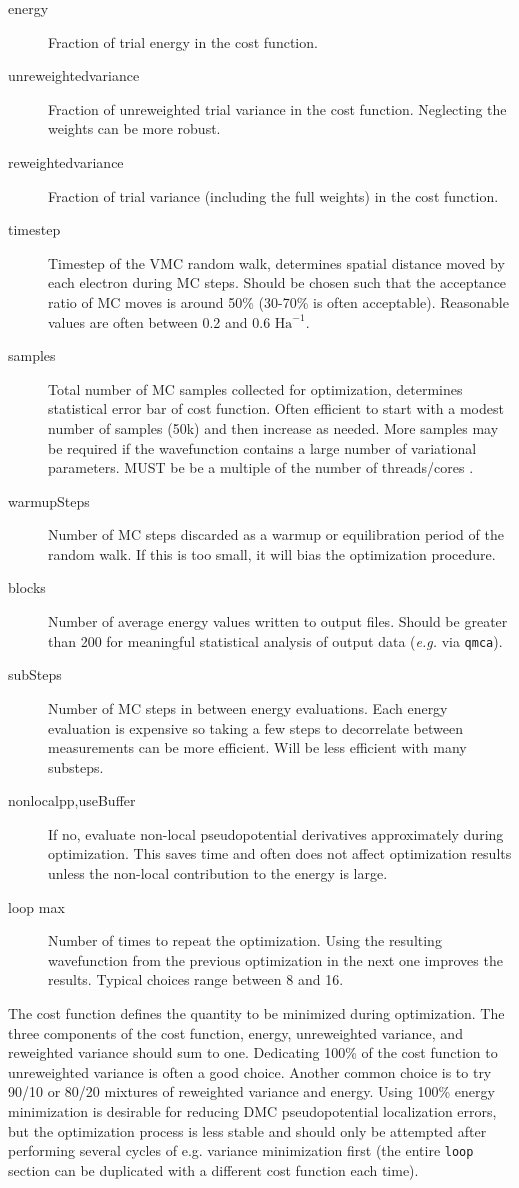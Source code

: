 \begin{description}
  \item[energy] Fraction of trial energy in the cost function.
  \item[unreweightedvariance] Fraction of unreweighted trial variance in the cost function.  Neglecting the weights can be more robust.
  \item[reweightedvariance] Fraction of trial variance (including the full weights) in the cost function.  
  \item[timestep] Timestep of the VMC random walk, determines spatial distance moved by each electron during MC steps.  Should be chosen such that the acceptance ratio of MC moves is around 50\% (30-70\% is often acceptable).  Reasonable values are often between 0.2 and 0.6 $\textrm{Ha}^{-1}$.
  \item[samples] Total number of MC samples collected for optimization, determines statistical error bar of cost function.  Often efficient to start with a modest number of samples (50k) and then increase as needed.  More samples may be required if the wavefunction contains a large number of variational parameters.  MUST be be a multiple of the number of threads/cores .
  \item[warmupSteps]  Number of MC steps discarded as a warmup or equilibration period of the random walk.  If this is too small, it will bias the optimization procedure.
  \item[blocks]  Number of average energy values written to output files.  Should be greater than 200 for meaningful statistical analysis of output data (\emph{e.g.} via \texttt{qmca}).
  \item[subSteps] Number of MC steps in between energy evaluations.  Each energy evaluation is expensive so taking a few steps to decorrelate between measurements can be more efficient.  Will be less efficient with many substeps.
  \item[nonlocalpp,useBuffer] If no, evaluate non-local pseudopotential derivatives approximately during optimization.  This saves time and often does not affect optimization results unless the non-local contribution to the energy is large.
  \item[loop max] Number of times to repeat the optimization.  Using the resulting wavefunction from the previous optimization in the next one improves the results.  Typical choices range between 8 and 16.   
\end{description}
The cost function defines the quantity to be minimized during optimization. The three components of the cost function, energy, unreweighted variance, and reweighted variance should sum to one.  Dedicating 100\% of the cost function to unreweighted variance is often a good choice.  Another common choice is to try 90/10 or 80/20 mixtures of reweighted variance and energy.  Using 100\% energy minimization is desirable for reducing DMC pseudopotential localization errors, but the optimization process is less stable and should only be attempted after performing several cycles of e.g. variance minimization first (the entire \texttt{loop} section can be duplicated with a different cost function each time).

